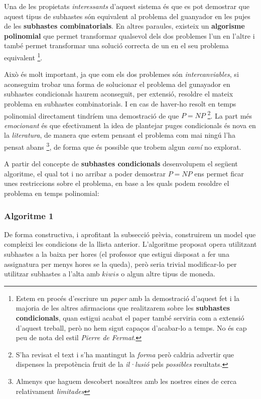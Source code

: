 \documentclass[10pt,twocolumn]{article}
\begin{document}
Una de les propietats \textit{interessants} d'aquest sistema és que es pot demostrar que aquest tipus de subhastes són equivalent al problema del guanyador en les pujes de les \textbf{subhastes combinatorials}. En altres paraules, existeix un \textbf{algorisme polinomial} que permet transformar qualsevol dels dos problemes l'un en l'altre i també permet transformar una solució correcta de un en el seu problema equivalent \footnote{Estem en procés d'escriure un \textit{paper} amb la demostració d'aquest fet i la majoria de les altres afirmacions que realitzarem sobre les \textbf{subhastes condicionals}, quan estigui acabat el paper també serviria com a extensió d'aquest treball, però no hem sigut capaços d'acabar-lo a temps. No és cap peu de nota del estil \textit{Pierre de Fermat}.}. 

Això és molt important, ja que com els dos problemes són \textit{intercanviables}, si aconseguim trobar una forma de solucionar el problema del gunayador en subhastes condicionals haurem aconseguit, per extensió, resoldre el mateix problema en subhastes combinatorials. I en cas de haver-ho resolt en temps polinomial directament tindríem una demostració de que $P=NP$ \footnote{S'ha revisat el text i s'ha mantingut la \textit{forma} però caldria advertir que dispenses la prepotència fruit de la \textit{il·lusió} pels \textit{possibles} resultats.}. La part més \textit{emocionant} és que efectivament la idea de plantejar puges condicionals és nova en la \textit{literatura}, de manera que estem pensant el problema com mai ningú l'ha pensat abans \footnote{Almenys que haguem descobert nosaltres amb les nostres eines de cerca relativament \textit{limitades}}, de forma que és possible que trobem algun \textit{camí} no explorat.

A partir del concepte de \textbf{subhastes condicionals} desenvolupem el següent algoritme, el qual tot i no arribar a poder demostrar $P=NP$ ens permet ficar unes restriccions sobre el problema, en base a les quals podem resoldre el problema en temps polinomial:

\subsubsection{Algoritme 1}

De forma constructiva, i aprofitant la subsecció prèvia, construirem un model que compleixi les condicions  de la llista anterior.
L'algoritme proposat opera utilitzant subhastes a la baixa per hores (el professor que estigui disposat a fer una assignatura per menys hores se la queda), però seria trivial modificar-lo per utilitzar subhastes a l'alta amb $kiwis$ o algun altre tipus de moneda.
\end{document}
